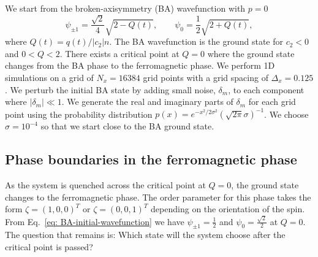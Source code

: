 We start from the broken-axisymmetry (BA) wavefunction with $p=0$
\begin{equation}
    \psi_{\pm 1} = \frac{\sqrt{2}}{4}\sqrt{2 - Q(t)}, \qquad
    \psi_0 = \frac{1}{2}\sqrt{2 + Q(t)},
    \label{eq: BA-initial-wavefunction}
\end{equation}
where $Q(t)=q(t)/|c_2|n$.
The BA wavefunction is the ground state for $c_2 < 0$ and $0 < Q < 2$.
There exists a critical point at $Q=0$ where the ground state changes from
the BA phase to the ferromagnetic phase.
We perform 1D simulations on a grid of $N_x = 16384$ grid points with a grid
spacing of $\Delta_x = 0.125$.
We perturb the initial BA state by adding small noise, $\delta_m$, to each
component where $|\delta_m| \ll 1$.
We generate the real and imaginary parts of $\delta_m$ for each grid point
using the probability distribution
$p(x) = e^{-x^2/2\sigma^2}(\sqrt{2\pi}\sigma)^{-1}$.
We choose $\sigma=10^{-4}$ so that we start close to the BA ground state.

\subsection{Phase boundaries in the ferromagnetic phase}
As the system is quenched across the critical point at $Q=0$, the ground state
changes to the ferromagnetic phase.
The order parameter for this phase takes the form $\zeta=(1,0,0)^T$ or 
$\zeta=(0,0,1)^T$ depending on the orientation of the spin.
From Eq.~\eqref{eq: BA-initial-wavefunction} we have
$\psi_{\pm 1} = \frac{1}{2}$ and $\psi_0 = \frac{\sqrt{2}}{2}$ at $Q=0$.
The question that remains is: Which state will the system choose after
the critical point is passed?


